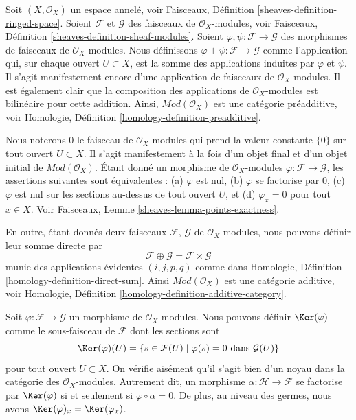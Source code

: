 \noindent
Soit $(X, \mathcal{O}_X)$ un espace annelé, voir Faisceaux, Définition
\ref{sheaves-definition-ringed-space}. Soient $\mathcal{F}$ et $\mathcal{G}$
des faisceaux de $\mathcal{O}_X$-modules, voir Faisceaux, Définition
\ref{sheaves-definition-sheaf-modules}. Soient
$\varphi, \psi : \mathcal{F} \to \mathcal{G}$ des morphismes de faisceaux
de $\mathcal{O}_X$-modules. Nous définissons
$\varphi + \psi : \mathcal{F} \to \mathcal{G}$ comme l'application qui,
sur chaque ouvert $U \subset X$, est la somme des applications induites par
$\varphi$ et $\psi$. Il s'agit manifestement encore d'une application de
faisceaux de $\mathcal{O}_X$-modules. Il est également clair que la composition
des applications de $\mathcal{O}_X$-modules est bilinéaire pour cette addition.
Ainsi, $\textit{Mod}(\mathcal{O}_X)$ est une catégorie préadditive, voir
Homologie, Définition \ref{homology-definition-preadditive}.

\medskip\noindent
Nous noterons $0$ le faisceau de $\mathcal{O}_X$-modules qui prend la valeur
constante $\{0\}$ sur tout ouvert $U \subset X$. Il s'agit manifestement à la
fois d'un objet final et d'un objet initial de
$\textit{Mod}(\mathcal{O}_X)$. Étant donné un morphisme de
$\mathcal{O}_X$-modules $\varphi : \mathcal{F} \to \mathcal{G}$, les
assertions suivantes sont équivalentes :
(a) $\varphi$ est nul, (b) $\varphi$ se factorise par $0$,
(c) $\varphi$ est nul sur les sections au-dessus de tout ouvert $U$, et
(d) $\varphi_x = 0$ pour tout $x \in X$. Voir Faisceaux, Lemme
\ref{sheaves-lemma-points-exactness}.

\medskip\noindent
En outre, étant donnés deux faisceaux $\mathcal{F}$, $\mathcal{G}$ de
$\mathcal{O}_X$-modules, nous pouvons définir leur somme directe par
$$
\mathcal{F} \oplus \mathcal{G} = \mathcal{F} \times \mathcal{G}
$$
munie des applications évidentes $(i, j, p, q)$ comme dans Homologie,
Définition \ref{homology-definition-direct-sum}. Ainsi
$\textit{Mod}(\mathcal{O}_X)$ est une catégorie additive, voir Homologie,
Définition \ref{homology-definition-additive-category}.

\medskip\noindent
Soit $\varphi : \mathcal{F} \to \mathcal{G}$ un morphisme de
$\mathcal{O}_X$-modules. Nous pouvons définir $\Ker(\varphi)$ comme le
sous-faisceau de $\mathcal{F}$ dont les sections sont
$$
\Ker(\varphi)(U) =
\{ s \in \mathcal{F}(U) \mid \varphi(s) = 0 \text{ dans } \mathcal{G}(U)\}
$$
pour tout ouvert $U \subset X$. On vérifie aisément qu'il s'agit bien d'un
noyau dans la catégorie des $\mathcal{O}_X$-modules. Autrement dit, un
morphisme $\alpha : \mathcal{H} \to \mathcal{F}$ se factorise par
$\Ker(\varphi)$ si et seulement si $\varphi \circ \alpha = 0$. De plus, au
niveau des germes, nous avons $\Ker(\varphi)_x = \Ker(\varphi_x)$.

